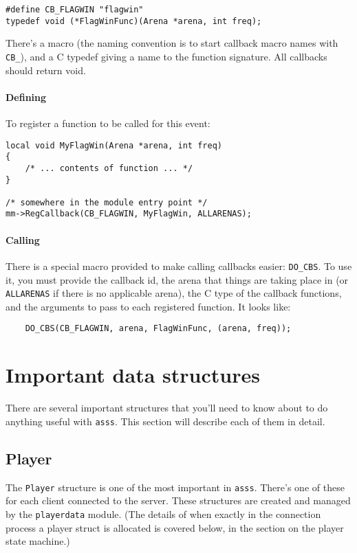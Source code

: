 \documentclass{article}
\newcommand{\asss}{\texttt{asss}}
\begin{document}
\begin{verbatim}
#define CB_FLAGWIN "flagwin"
typedef void (*FlagWinFunc)(Arena *arena, int freq);
\end{verbatim}

There's a macro (the naming convention is to start callback macro names
with \verb/CB_/), and a C typedef giving a name to the function
signature. All callbacks should return void.

\paragraph{Defining}
To register a function to be called for this event:

\begin{verbatim}
local void MyFlagWin(Arena *arena, int freq)
{
    /* ... contents of function ... */
}

/* somewhere in the module entry point */
mm->RegCallback(CB_FLAGWIN, MyFlagWin, ALLARENAS);
\end{verbatim}

\paragraph{Calling}
There is a special macro provided to make calling callbacks easier:
\verb/DO_CBS/. To use it, you must provide the callback id, the arena
that things are taking place in (or \verb/ALLARENAS/ if there is no
applicable arena), the C type of the callback functions, and the
arguments to pass to each registered function. It looks like:

\begin{verbatim}
    DO_CBS(CB_FLAGWIN, arena, FlagWinFunc, (arena, freq));
\end{verbatim}


\section{Important data structures}

There are several important structures that you'll need to know about to
do anything useful with \asss{}. This section will describe each of them
in detail.

\subsection{Player}

The \verb/Player/ structure is one of the most important in \asss{}.
There's one of these for each client connected to the server. These
structures are created and managed by the \verb/playerdata/ module. (The
details of when exactly in the connection process a player struct is
allocated is covered below, in the section on the player state machine.)
\end{document}
